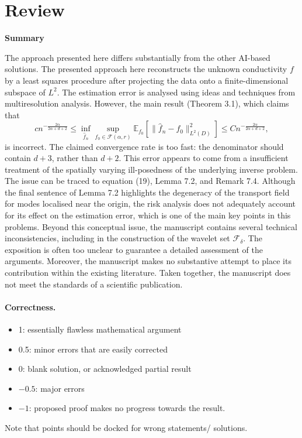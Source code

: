 \documentclass[11pt]{article}
\theoremstyle{remark}
\begin{document}
\maketitle

\section{Review}

\textbf{Summary}

The approach presented here differs substantially from the other AI-based solutions. The presented approach here reconstructs the unknown conductivity $f$ by a least squares procedure after projecting the data onto a finite-dimensional subspace of \(L^2\). The estimation error is analysed using ideas and techniques from multiresolution analysis.
However, the main result (Theorem 3.1), which claims that
\[
cn^{-\frac{2\alpha}{2\alpha+d+2}}
\leq
\inf_{\hat f_n}
\sup_{f_0\in\mathcal F(\alpha,r)}
\mathbb E_{f_0}\!\left[
\|\hat f_n-f_0\|_{L^2(D)}^2
\right]
\leq
Cn^{-\frac{2\alpha}{2\alpha+d+2}},
\]
is incorrect. The claimed convergence rate is too fast: the denominator should contain \(d+3\), rather than \(d+2\). This error appears to come from a insufficient treatment of the spatially varying ill-posedness of the underlying inverse problem.
The issue can be traced to equation (19), Lemma 7.2, and Remark 7.4. Although the final sentence of Lemma 7.2 highlights the degeneracy of the transport field for modes localised near the origin, the risk analysis does not adequately account for its effect on the estimation error, which is one of the main key points in this problems.
Beyond this conceptual issue, the manuscript contains several technical inconsistencies, including in the construction of the wavelet set \(\mathcal F_\delta\). The exposition is often too unclear to guarantee a detailed assessment of the arguments. Moreover, the manuscript makes no substantive attempt to place its contribution within the existing literature. Taken together, the manuscript does not meet the standards of a scientific publication.

\paragraph{Correctness.}
\begin{itemize}
	\item  1: essentially flawless mathematical argument
	\item  0.5: minor errors that are easily corrected
	\item  0: blank solution, or acknowledged partial result
	\item  $-0.5$: major errors
	\item  $-1$: proposed proof makes no progress towards the result.
\end{itemize}
Note that points should be docked for wrong statements/ solutions.
\end{document}
